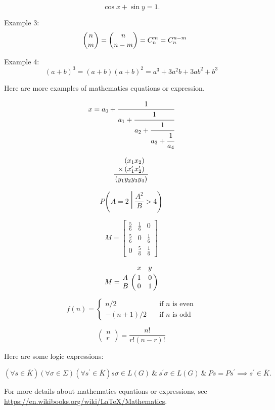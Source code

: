 \documentclass{must-assignment}
\begin{document}
$$
\cos{x}+\sin{y}=1.
$$

Example 3:
\begin{equation}
\label{eq3}
\quad\dbinom{n}{m}=\dbinom{n}{n-m}=C_n^m=C_n^{n-m}
\end{equation}

Example 4:
\begin{equation}
    (a + b)^3 = (a + b) (a + b)^2=a^3 + 3a^2b + 3ab^2 + b^3     
\end{equation}

Here are more examples of mathematics equations or expression.


\begin{equation}
  x = a_0 + \cfrac{1}{a_1 
          + \cfrac{1}{a_2 
          + \cfrac{1}{a_3 + \cfrac{1}{a_4} } } }
\end{equation}




\begin{equation*}
\frac{
    \begin{array}[b]{r}
      \left( x_1 x_2 \right)\\
      \times \left( x'_1 x'_2 \right)
    \end{array}
  }{
    \left( y_1y_2y_3y_4 \right)
  }
\end{equation*}


\[
P\left(A=2\middle|\frac{A^2}{B}>4\right)
\]


\[
M = \begin{bmatrix}
       \frac{5}{6} & \frac{1}{6} & 0           \\[0.3em]
       \frac{5}{6} & 0           & \frac{1}{6} \\[0.3em]
       0           & \frac{5}{6} & \frac{1}{6}
     \end{bmatrix}
\]


\[
M = \bordermatrix{~ & x & y \cr
                  A & 1 & 0 \cr
                  B & 0 & 1 \cr}
\]


\[ f(n) =
  \begin{cases}
    n/2       & \quad \text{if } n \text{ is even}\\
    -(n+1)/2  & \quad \text{if } n \text{ is odd}
  \end{cases}
\]



\[
\left(
    \begin{array}{c}
      n \\
      r
    \end{array}
  \right) = \frac{n!}{r!(n-r)!}
\]



Here are some logic expressions:


$$
(\forall s\in\overline{K})(\forall\sigma\in\Sigma)(\forall s^\prime\in\overline{K})s\sigma\in L(G)~\&~s^\prime\sigma\in L(G)~\&~Ps=Ps^\prime\implies s^
\prime\in\overline{K}.
$$




For more details about mathematics equations or expressions, see \url{https://en.wikibooks.org/wiki/LaTeX/Mathematics}.


\newpage

  

\end{document}
